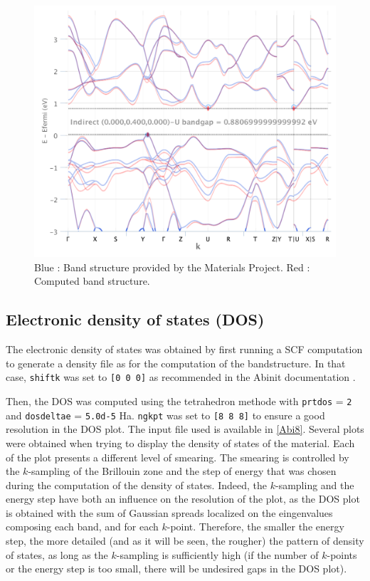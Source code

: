 \documentclass[11pt,a4paper]{article}
\begin{document}
\begin{figure}
\centering
\includegraphics[width=\textwidth]{images/bsCombined.pdf}
\caption{Blue : Band structure provided by the Materials Project. Red : Computed band structure.}
\label{fig:bsMPCombined}
\end{figure}
\subsection{Electronic density of states (DOS)}
The electronic density of states was obtained by first running a SCF computation to generate a density file as for the computation of the bandstructure. In that case, \texttt{shiftk} was set to \texttt{[0 0 0]} as recommended in the Abinit documentation \cite{AbinitManual}.

Then, the DOS was computed using the tetrahedron methode with \texttt{prtdos} = \texttt{2} and \texttt{dosdeltae} = \texttt{5.0d-5} Ha. \texttt{ngkpt} was set to \texttt{[8 8 8]} to ensure a good resolution in the DOS plot. The input file used is available in \autoref{Abi8}. Several plots were obtained when trying to display the density of states of the material. Each of the plot presents a different level of smearing. The smearing is controlled by the $k$-sampling of the Brillouin zone and the step of energy that was chosen during the computation of the density of states. Indeed, the $k$-sampling and the energy step have both an influence on the resolution of the plot, as the DOS plot is obtained with the sum of Gaussian spreads localized on the eingenvalues composing each band, and for each $k$-point. Therefore, the smaller the energy step, the more detailed (and as it will be seen, the rougher) the pattern of density of states, as long as the $k$-sampling is sufficiently high (if the number of $k$-points or the energy step is too small, there will be undesired gaps in the DOS plot).
 
\end{document}
